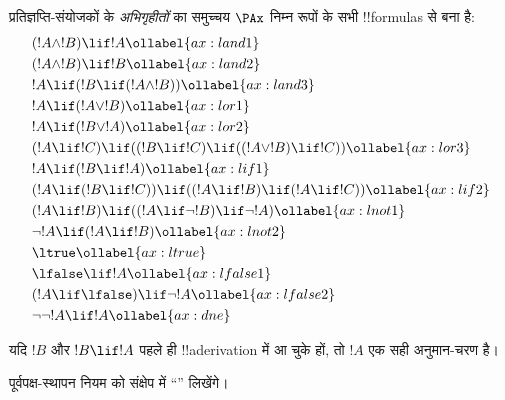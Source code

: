 \documentclass[../../../include/open-logic-section]{subfiles}
\begin{document}
      {}
      {}


\begin{defn}[अभिगृहीत]
प्रतिज्ञप्ति-संयोजकों के \emph{अभिगृहीतों} का समुच्चय $\PAx$ निम्न रूपों के
सभी !!{formula}s से बना है:
\begin{align}
  & (!A \land !B) \lif !A \ollabel{ax:land1}\\
  & (!A \land !B) \lif !B \ollabel{ax:land2}\\
  & {}!A \lif (!B \lif (!A \land !B)) \ollabel{ax:land3}\\
  & {}!A \lif (!A \lor !B) \ollabel{ax:lor1}\\
  & {}!A \lif (!B \lor !A) \ollabel{ax:lor2}\\
  & (!A \lif !C) \lif ((!B \lif !C) \lif ((!A \lor !B) \lif !C)) \ollabel{ax:lor3}\\
  & {}!A \lif (!B \lif !A) \ollabel{ax:lif1}\\
  & (!A \lif (!B \lif !C)) \lif ((!A \lif !B) \lif (!A \lif !C)) \ollabel{ax:lif2}\\
  & (!A \lif !B) \lif ((!A \lif \lnot !B) \lif \lnot !A) \ollabel{ax:lnot1}\\
  & \lnot !A \lif (!A \lif !B) \ollabel{ax:lnot2}\\
  & \ltrue \ollabel{ax:ltrue}\\
  & \lfalse \lif !A \ollabel{ax:lfalse1}\\
  & (!A \lif \lfalse) \lif \lnot !A \ollabel{ax:lfalse2}\\
  & \lnot\lnot !A \lif !A \ollabel{ax:dne}
\end{align}
\end{defn}

\begin{defn}[पूर्वपक्ष-स्थापन]
  यदि $!B$ और $!B \lif !A$ पहले ही !!a{derivation} में आ चुके हों, तो
  $!A$ एक सही अनुमान-चरण है।
\end{defn}

पूर्वपक्ष-स्थापन नियम को संक्षेप में ``\MP'' लिखेंगे।
\end{document}
